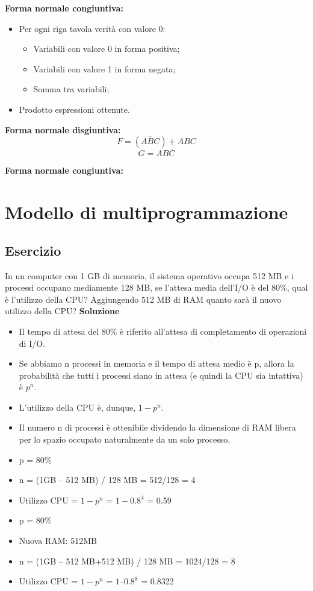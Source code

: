 \documentclass{article}
\begin{document}
\textbf{Forma normale congiuntiva:}
\begin{itemize}
\item Per ogni riga tavola verità con valore 0:
\begin{itemize}
\item Variabili con valore 0 in forma positiva;
\item Variabili con valore 1 in forma negata;
\item  Somma tra variabili;
\end{itemize}
\item Prodotto espressioni ottenute.
\end{itemize}

\textbf{Forma normale disgiuntiva:}
\[ F = (\overline{ABC})+ ABC \]
\[ G = AB\overline{C} \]

\textbf{Forma normale congiuntiva:}
\[  \]

\fi


\section{Modello di multiprogrammazione}
\subsection{Esercizio}
In un computer con 1 GB di memoria, il sistema operativo occupa 512 MB e i processi occupano mediamente 128 MB, se l’attesa media dell’I/O è del 80\%, qual è l’utilizzo della CPU? Aggiungendo 512 MB di RAM quanto sarà il nuovo utilizzo della CPU?
\vskip 0.5cm
\textbf{Soluzione}\\
\begin{itemize}
\item Il tempo di attesa del 80\% è riferito all'attesa di completamento di operazioni di I/O.
\item Se abbiamo n processi in memoria e il tempo di attesa medio è p, allora la probabilità che tutti i processi siano in attesa (e quindi la CPU sia intattiva) è $p^n$.
\item L'utilizzo della CPU è, dunque, $1- p^n$.
\item Il numero n di processi è ottenibile dividendo la dimensione di RAM libera per lo spazio occupato naturalmente da un solo processo.
\item  p = 80\% 
\item  n = (1GB – 512 MB) / 128 MB = 512/128 = 4 
\item  Utilizzo CPU = $1- p^n$ = $1 - 0.8^4$ = 0.59 
\item  p = 80\% 
\item  Nuova RAM: 512MB 
\item  n = (1GB – 512 MB+512 MB) / 128 MB = 1024/128 = 8 
\item  Utilizzo CPU = $1- p^n$ = $1 – 0.8^8$ = 0.8322 
\end{itemize}
\end{document}
